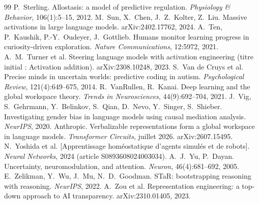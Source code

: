 \documentclass[11pt,a4paper]{article}
\begin{document}
\begin{thebibliography}{99}
 P.~Sterling. Allostasis: a model of predictive regulation. \emph{Physiology \& Behavior}, 106(1):5--15, 2012.
 M.~Sun, X.~Chen, J.~Z.~Kolter, Z.~Liu. Massive activations in large language models. arXiv:2402.17762, 2024.
 A.~Ten, P.~Kaushik, P.-Y.~Oudeyer, J.~Gottlieb. Humans monitor learning progress in curiosity-driven exploration. \emph{Nature Communications}, 12:5972, 2021.
 A.~M.~Turner et al. Steering language models with activation engineering (titre initial : Activation addition). arXiv:2308.10248, 2023.
 S.~Van de Cruys et al. Precise minds in uncertain worlds: predictive coding in autism. \emph{Psychological Review}, 121(4):649--675, 2014.
 R.~VanRullen, R.~Kanai. Deep learning and the global workspace theory. \emph{Trends in Neurosciences}, 44(9):692--704, 2021.
 J.~Vig, S.~Gehrmann, Y.~Belinkov, S.~Qian, D.~Nevo, Y.~Singer, S.~Shieber. Investigating gender bias in language models using causal mediation analysis. \emph{NeurIPS}, 2020.
 Anthropic. Verbalizable representations form a global workspace in language models. \emph{Transformer Circuits}, juillet 2026. arXiv:2607.15495.
 N.~Yoshida et al. [Apprentissage homéostatique d'agents simulés et de robots]. \emph{Neural Networks}, 2024 (article S0893608024003034).
 A.~J.~Yu, P.~Dayan. Uncertainty, neuromodulation, and attention. \emph{Neuron}, 46(4):681--692, 2005.
 E.~Zelikman, Y.~Wu, J.~Mu, N.~D.~Goodman. STaR: bootstrapping reasoning with reasoning. \emph{NeurIPS}, 2022.
 A.~Zou et al. Representation engineering: a top-down approach to AI transparency. arXiv:2310.01405, 2023.

\end{thebibliography}
\end{document}
